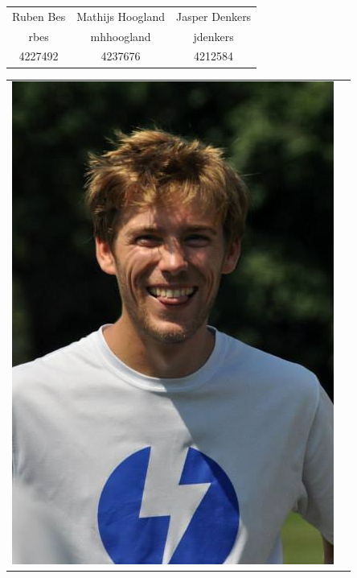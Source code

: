 \begin{titlepage}
\begin{center}
\begin{table}[ht]
\begin{tabular}{ccc}
Ruben Bes	& Mathijs Hoogland	& Jasper Denkers\\
rbes 		& mhhoogland 		& jdenkers\\
4227492 	& 4237676 			& 4212584\\
\end{tabular}
\end{table}

\begin{table}[ht]
\centering
\begin{tabular}{cc}
\includegraphics[scale=0.2]{robbert.png} &

\end{tabular}
\end{table}
\end{center}
\end{titlepage}

